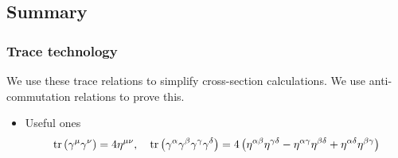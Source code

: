 \subsection*{Summary}

\subsubsection*{Trace technology}
We use these trace relations 
to simplify cross-section calculations. 
We use anti-commutation relations to 
prove this. 
\begin{itemize}
	\item Useful ones 
	\[
		\tr\left( \gamma ^ \mu \gamma ^ \nu  \right)   = 4 \eta ^{ \mu \nu }, \quad \tr \left( \gamma ^ \alpha 
		\gamma ^ \beta \gamma ^ \gamma \gamma ^ \delta \right)   = 4 \left( \eta ^{ \alpha \beta } \eta ^{ \gamma \delta } 
	 - \eta ^{ \alpha \gamma } \eta ^{ \beta \delta } 
 + \eta ^{ \alpha \delta } \eta ^{ \beta \gamma } \right) 
	\] 
\end{itemize}


